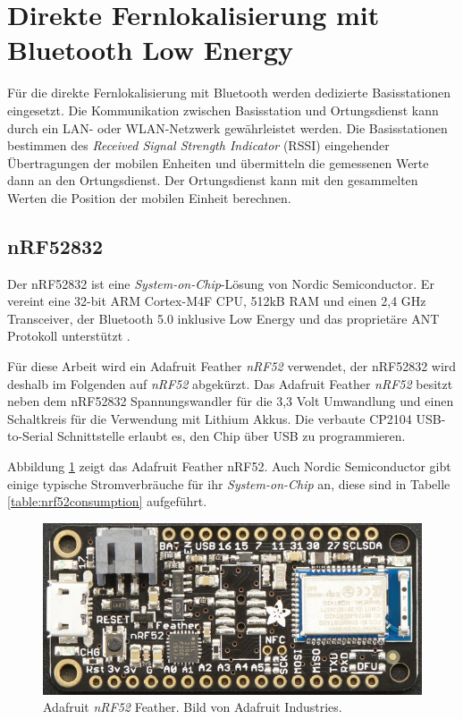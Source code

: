 \section{Direkte Fernlokalisierung mit Bluetooth Low Energy}
\label{ch:phase3}
Für die direkte Fernlokalisierung mit Bluetooth werden dedizierte Basisstationen eingesetzt. 
Die Kommunikation zwischen Basisstation und Ortungsdienst kann durch ein LAN- oder WLAN-Netzwerk gewährleistet werden.
Die Basisstationen bestimmen des \emph{Received Signal Strength Indicator} (RSSI) eingehender Übertragungen der mobilen Enheiten und übermitteln die gemessenen Werte dann an den Ortungsdienst.
Der Ortungsdienst kann mit den gesammelten Werten die Position der mobilen Einheit berechnen.

\subsection{nRF52832}
Der nRF52832 ist eine \emph{System-on-Chip}-Lösung von Nordic Semiconductor.
Er vereint eine 32-bit ARM Cortex-M4F CPU, 512kB RAM und einen 2,4 GHz Transceiver, der Bluetooth 5.0 inklusive Low Energy und das proprietäre ANT Protokoll unterstützt \cite{nordic2017nrf}.

Für diese Arbeit wird ein Adafruit Feather \emph{nRF52} verwendet, der nRF52832 wird deshalb im Folgenden auf \emph{nRF52} abgekürzt.
Das Adafruit Feather \emph{nRF52} besitzt neben dem nRF52832 Spannungswandler für die 3,3 Volt Umwandlung und einen Schaltkreis für die Verwendung mit Lithium Akkus. 
Die verbaute CP2104 USB-to-Serial Schnittstelle erlaubt es, den Chip über USB zu programmieren.

Abbildung \ref{fig:nrf52layout} zeigt das Adafruit Feather nRF52.
Auch Nordic Semiconductor gibt einige typische Stromverbräuche für ihr \emph{System-on-Chip} an, diese sind in Tabelle \ref{table:nrf52consumption} aufgeführt.

\begin{figure}[h]
  \centering
	\includegraphics[width=\textwidth]{images/nrf52ada.png}
  \caption{Adafruit \emph{nRF52} Feather. Bild von Adafruit Industries\protect \footnotemark.}
  \label{fig:nrf52layout}
\end{figure}

